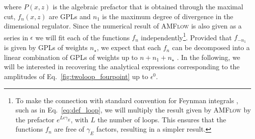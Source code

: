 \documentclass[a4paper,11pt]{article}
\begin{document}
where  $P(x,z)$ is the algebraic prefactor that is obtained through the maximal cut, $f_n(x,z)$ are GPLs and $n_1$ is the maximum degree of divergence in the dimensional regulator.  Since the numerical result of \textsc{AMFlow} is also given as a series in $\epsilon$ we will fit each of the functions $f_n$ independently\footnote{To make the connection with standard convention for Feynman integrals \cite{Weinzierl:2022eaz}, such as in Eq.~\eqref{eq:def_loop}, we will multiply the result given by \textsc{AMFlow} by the prefactor $e^{L \epsilon \gamma_E}$, with $L$ the number of loops. This ensures that the functions $f_n$ are free of $\gamma_E$ factors, resulting in a simpler result.}. Provided that $f_{-n_1}$ is given by GPLs of weights $n_\star$, we expect that each $f_n$ can be decomposed into a linear combination of GPLs of weights up to $n+n_1+n_\star$ \cite{Henn:2013pwa,Henn:2014qga}. In the following, we will be interested in recovering the analytical expressions corresponding to the amplitudes of Eq.~\eqref{fig:twoloop_fourpoint} up to $\epsilon^0$.
\end{document}
